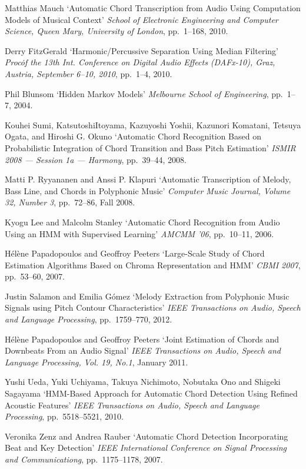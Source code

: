 \documentclass{article}
\begin{document}
\begin{thebibliography}{citations}
Matthias Mauch
`Automatic Chord Transcription from Audio Using Computation Models of Musical Context'
{\it School of Electronic Engineering and Computer Science, Queen Mary, University of London},
pp.~1--168, 2010.

Derry FitzGerald
`Harmonic/Percussive Separation Using Median Filtering'
{\it Proc\. of the 13th Int. Conference on Digital Audio Effects (DAFx-10), Graz, Austria, September 6--10, 2010},
pp.~1--4, 2010.

Phil Blunsom
`Hidden Markov Models'
{\it Melbourne School of Engineering},
pp.~1--7, 2004.

Kouhei Sumi, KatsutoshiItoyama, Kazuyoshi Yoshii, Kazunori Komatani, Tetsuya Ogata, and Hiroshi G. Okuno
`Automatic Chord Recognition Based on Probabilistic Integration of Chord Transition and Bass Pitch Estimation'
{\it ISMIR 2008 --- Session 1a --- Harmony},
pp.~39--44, 2008.

Matti P. Ryyananen and Anssi P. Klapuri
`Automatic Transcription of Melody, Bass Line, and Chords in Polyphonic Music'
{\it Computer Music Journal, Volume 32, Number 3},
pp.~72--86, Fall 2008.

Kyogu Lee and Malcolm Stanley
`Automatic Chord Recognition from Audio Using an HMM with Supervised Learning'
{\it AMCMM '06},
pp.~10--11, 2006.

Hélène Papadopoulos and Geoffroy Peeters
`Large-Scale Study of Chord Estimation Algorithms Based on Chroma Representation and HMM'
{\it CBMI 2007},
pp.~53--60, 2007.

Justin Salamon and Emilia G{\'o}mez
`Melody Extraction from Polyphonic Music Signals using Pitch Contour Characteristics'
{\it IEEE Transactions on Audio, Speech and Language Processing},
pp.~1759--770, 2012.

Hélène Papadopoulos and Geoffroy Peeters
`Joint Estimation of Chords and Downbeats From an Audio Signal'
{\it IEEE Transactions on Audio, Speech and Language Processing, Vol. 19, No.1},
January 2011.

Yushi Ueda, Yuki Uchiyama, Takuya Nichimoto, Nobutaka Ono and Shigeki Sagayama
`HMM-Based Approach for Automatic Chord Detection Using Refined Acoustic Features'
{\it IEEE Transactions on Audio, Speech and Language Processing},
pp.~5518--5521, 2010.

Veronika Zenz and Andrea Rauber
`Automatic Chord Detection Incorporating Beat and Key Detection'
{\it IEEE International Conference on Signal Processing and Communicationg},
pp.~1175--1178, 2007.


\end{thebibliography}
\end{document}
